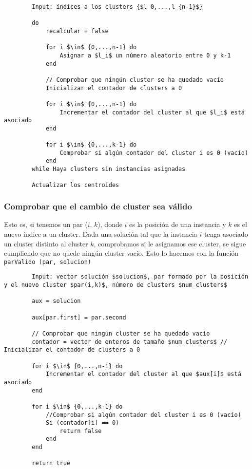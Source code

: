 		\footnotesize
		\begin{lstlisting}
		Input: índices a los clusters {$l_0,...,l_{n-1}$}

		do 
			recalcular = false
			
			for i $\in$ {0,...,n-1} do 
				Asignar a $l_i$ un número aleatorio entre 0 y k-1
			end
			
			// Comprobar que ningún cluster se ha quedado vacío
			Inicializar el contador de clusters a 0
			
			for i $\in$ {0,...,n-1} do 
				Incrementar el contador del cluster al que $l_i$ está asociado
			end
			
			for i $\in$ {0,...,k-1} do
				Comprobar si algún contador del cluster i es 0 (vacío)
			end
		while Haya clusters sin instancias asignadas
		
		Actualizar los centroides
		\end{lstlisting}
		\normalsize

		\subsubsection{Comprobar que el cambio de cluster sea válido}
		Esto es, si tenemos un par ($i$, $k$), donde $i$ es la posición de una instancia y $k$ es el nuevo índice a un cluster.
		Dada una solución tal que la instancia $i$ tenga asociado un cluster distinto al cluster $k$, comprobamos si le asignamos ese cluster, 
		se sigue cumpliendo que no quede ningún cluster vacío. Esto lo hacemos con la función \lstinline!parValido (par, solucion)!

		\footnotesize
		\begin{lstlisting}
		Input: vector solución $solucion$, par formado por la posición y el nuevo cluster $par(i,k)$, número de clusters $num_clusters$

		aux = solucion 

		aux[par.first] = par.second

		// Comprobar que ningún cluster se ha quedado vacío
		contador = vector de enteros de tamaño $num_clusters$ // Inicializar el contador de clusters a 0
			
		for i $\in$ {0,...,n-1} do 
			Incrementar el contador del cluster al que $aux[i]$ está asociado
		end
			
		for i $\in$ {0,...,k-1} do
			//Comprobar si algún contador del cluster i es 0 (vacío)
			Si (contador[i] == 0)
				return false		
			end
		end

		return true
		\end{lstlisting}
		\normalsize


